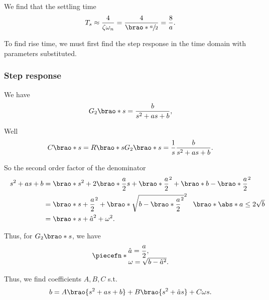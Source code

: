 \documentclass[12pt]{article}
\DeclarePairedDelimiter\brao()%
\DeclarePairedDelimiter\abs||
\DeclarePairedDelimiter\piecefn\{.
\begin{document}
\begin{enumerate}
        We find that the settling time
        \begin{equation}
            T_s \approx \frac4{\zeta\omega_n} = \frac4{\brao*{\sfrac{a}2}} = \frac8a.
        \end{equation}

        To find rise time, we must first find the step response in the time domain with parameters substituted.

        \subsubsection{Step response}
        We have
        \[
            G_2\brao*s = \frac{b}{s^2 + as + b},
        \]

        Well
        \begin{equation}
            C\brao*s = R\brao*s G_2\brao*s = \frac1s \frac{b}{s^2 + as + b}.
        \end{equation}

        So the second order factor of the denominator
        \begin{equation}
            \begin{aligned}
                s^2 + as + b
                &{} = \brao*{s^2 + 2\brao*{\frac{a}2}s + \brao*{\frac{a}2}^2} + \brao*{b - \brao*{\frac{a}2}^2}
            \\*
                &{} = \brao*{s + \frac{a}2}^2 + \brao*{\sqrt{b - \brao*{\frac{a}2}^2}}^2
                \rlap{
                    $\hskip0.5em\brao*{\abs*{a} \leq 2\sqrt{b}}$
                }
            \\*
                &{}= \brao*{s + \hat{a}}^2 + \omega^2.
            \\*
            \end{aligned}
        \end{equation}

        Thus, for $G_2\brao*s$, we have
        \begin{equation}
            \piecefn*{
                \begin{array}{@{}l@{}}
                    \displaystyle
                    \hat{a} = \frac{a}2, \\*
                    \omega = \sqrt{b - \hat{a}^2}. \\*
                \end{array}
            }
        \end{equation}

        Thus, we find coefficients $A,B,C$ s.t.
        \begin{equation}
            b = A\brao{s^2 + as + b} + B\brao{s^2 + \hat{a}s} + C\omega s.
        \end{equation}


\end{enumerate}
\end{document}
